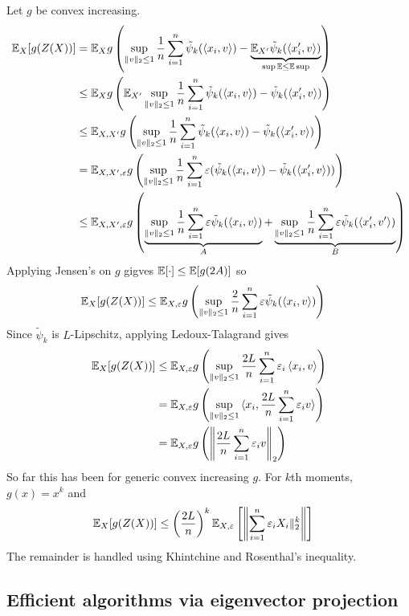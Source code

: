 Let $g$ be convex increasing.
\begin{align}
  \mathbb{E}_X[g(Z(X))]
  &= \mathbb{E}_X g\left(\sup_{\|v\|_2 \leq 1} \frac{1}{n} \sum_{i=1}^n \tilde\psi_k(\braket{x_i, v}) - \underbrace{\mathbb{E}_{X'} \tilde\psi_k(\braket{x_i', v})}_{\sup \mathbb{E} \leq \mathbb{E} \sup} \right) \\
  &\leq \mathbb{E}_X g\left(\mathbb{E}_{X'} \sup_{\|v\|_2 \leq 1} \frac{1}{n} \sum_{i=1}^n \tilde\psi_k(\braket{x_i, v}) - \tilde\psi_k(\braket{x_i', v}) \right) \\
  &\leq \mathbb{E}_{X,X'} g\left(\sup_{\|v\|_2 \leq 1} \frac{1}{n} \sum_{i=1}^n \tilde\psi_k(\braket{x_i, v}) - \tilde\psi_k(\braket{x_i', v}) \right) \\
  &= \mathbb{E}_{X,X',\varepsilon} g\left(\sup_{\|v\|_2 \leq 1} \frac{1}{n} \sum_{i=1}^n \varepsilon(\tilde\psi_k(\braket{x_i, v}) - \tilde\psi_k(\braket{x_i', v})) \right) \\
  &\leq \mathbb{E}_{X,X',\varepsilon} g\left(
    \underbrace{\sup_{\|v\|_2 \leq 1} \frac{1}{n}\sum_{i=1}^n
    \varepsilon \tilde\psi_k(\braket{x_i, v})}_A
    + \underbrace{\sup_{\|v\|_2 \leq 1} \frac{1}{n}\sum_{i=1}^n
    \varepsilon\tilde\psi_k(\braket{x_i', v'})}_B
\right)
\end{align}
Applying Jensen's on $g$ gigves $\mathbb{E}[\cdot] \leq \mathbb{E}[g(2A)]$ so
\begin{align}
  \mathbb{E}_X[g(Z(X))]
  &\leq \mathbb{E}_{X,\varepsilon} g\left(\sup_{\|v\|_2 \leq 1} \frac{2}{n} \sum_{i=1}^n \varepsilon\tilde\psi_k(\braket{x_i, v}) \right)
\end{align}
Since $\tilde\psi_k$ is $L$-Lipschitz, applying Ledoux-Talagrand gives
\begin{align}
  \mathbb{E}_X[g(Z(X))]
  &\leq \mathbb{E}_{X,\varepsilon} g\left(\sup_{\|v\|_2 \leq 1} \frac{2 L}{n} \sum_{i=1}^n \varepsilon_i\braket{x_i, v} \right) \\
  &= \mathbb{E}_{X,\varepsilon} g\left(\sup_{\|v\|_2 \leq 1} \braket{x_i, \frac{2 L}{n} \sum_{i=1}^n \varepsilon_i v} \right) \\
  &= \mathbb{E}_{X,\varepsilon} g\left(\left\|\frac{2 L}{n} \sum_{i=1}^n \varepsilon_i v\right\|_2 \right)
\end{align}
So far this has been for generic convex increasing $g$.
For $k$th moments, $g(x) = x^k$ and
\begin{align}
  \mathbb{E}_X[g(Z(X))]
  &\leq \left(\frac{2 L}{n}\right)^k
  \mathbb{E}_{X,\varepsilon} \left[\left\|
    \sum_{i=1}^n \varepsilon_i X_i\|_2^k
  \right\|\right]
\end{align}
The remainder is handled using Khintchine and Rosenthal's inequality.

\subsection{Efficient algorithms via eigenvector projection}%

